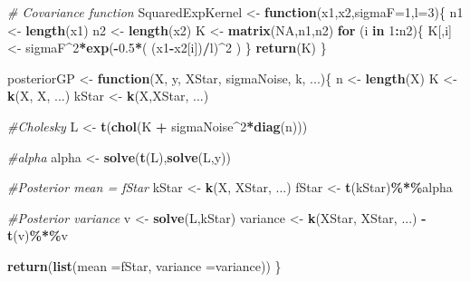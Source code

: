 \documentclass[
]{article}
\newenvironment{Shaded}{\begin{snugshade}}{\end{snugshade}}
\newcommand{\AttributeTok}[1]{\textcolor[rgb]{0.13,0.29,0.53}{#1}}
\newcommand{\CommentTok}[1]{\textcolor[rgb]{0.56,0.35,0.01}{\textit{#1}}}
\newcommand{\ConstantTok}[1]{\textcolor[rgb]{0.56,0.35,0.01}{#1}}
\newcommand{\ControlFlowTok}[1]{\textcolor[rgb]{0.13,0.29,0.53}{\textbf{#1}}}
\newcommand{\DecValTok}[1]{\textcolor[rgb]{0.00,0.00,0.81}{#1}}
\newcommand{\FloatTok}[1]{\textcolor[rgb]{0.00,0.00,0.81}{#1}}
\newcommand{\FunctionTok}[1]{\textcolor[rgb]{0.13,0.29,0.53}{\textbf{#1}}}
\newcommand{\NormalTok}[1]{#1}
\newcommand{\OtherTok}[1]{\textcolor[rgb]{0.56,0.35,0.01}{#1}}
\newcommand{\SpecialCharTok}[1]{\textcolor[rgb]{0.81,0.36,0.00}{\textbf{#1}}}
\begin{document}
\begin{Shaded}
\begin{Highlighting}[]
\CommentTok{\# Covariance function}
\NormalTok{SquaredExpKernel }\OtherTok{\textless{}{-}} \ControlFlowTok{function}\NormalTok{(x1,x2,}\AttributeTok{sigmaF=}\DecValTok{1}\NormalTok{,}\AttributeTok{l=}\DecValTok{3}\NormalTok{)\{}
\NormalTok{  n1 }\OtherTok{\textless{}{-}} \FunctionTok{length}\NormalTok{(x1)}
\NormalTok{  n2 }\OtherTok{\textless{}{-}} \FunctionTok{length}\NormalTok{(x2)}
\NormalTok{  K }\OtherTok{\textless{}{-}} \FunctionTok{matrix}\NormalTok{(}\ConstantTok{NA}\NormalTok{,n1,n2)}
  \ControlFlowTok{for}\NormalTok{ (i }\ControlFlowTok{in} \DecValTok{1}\SpecialCharTok{:}\NormalTok{n2)\{}
\NormalTok{    K[,i] }\OtherTok{\textless{}{-}}\NormalTok{ sigmaF}\SpecialCharTok{\^{}}\DecValTok{2}\SpecialCharTok{*}\FunctionTok{exp}\NormalTok{(}\SpecialCharTok{{-}}\FloatTok{0.5}\SpecialCharTok{*}\NormalTok{( (x1}\SpecialCharTok{{-}}\NormalTok{x2[i])}\SpecialCharTok{/}\NormalTok{l)}\SpecialCharTok{\^{}}\DecValTok{2}\NormalTok{ )}
\NormalTok{  \}}
  \FunctionTok{return}\NormalTok{(K)}
\NormalTok{\}}

\NormalTok{posteriorGP }\OtherTok{\textless{}{-}} \ControlFlowTok{function}\NormalTok{(X, y, XStar, sigmaNoise, k, ...)\{}
\NormalTok{  n }\OtherTok{\textless{}{-}} \FunctionTok{length}\NormalTok{(X)}
\NormalTok{  K }\OtherTok{\textless{}{-}} \FunctionTok{k}\NormalTok{(X, X, ...)}
\NormalTok{  kStar }\OtherTok{\textless{}{-}} \FunctionTok{k}\NormalTok{(X,XStar, ...)}
  
  \CommentTok{\#Cholesky }
\NormalTok{  L }\OtherTok{\textless{}{-}} \FunctionTok{t}\NormalTok{(}\FunctionTok{chol}\NormalTok{(K }\SpecialCharTok{+}\NormalTok{ sigmaNoise}\SpecialCharTok{\^{}}\DecValTok{2}\SpecialCharTok{*}\FunctionTok{diag}\NormalTok{(n)))}

  \CommentTok{\#alpha}
\NormalTok{  alpha }\OtherTok{\textless{}{-}} \FunctionTok{solve}\NormalTok{(}\FunctionTok{t}\NormalTok{(L),}\FunctionTok{solve}\NormalTok{(L,y))}
  
  \CommentTok{\#Posterior mean = fStar}
\NormalTok{  kStar }\OtherTok{\textless{}{-}} \FunctionTok{k}\NormalTok{(X, XStar, ...)}
\NormalTok{  fStar }\OtherTok{\textless{}{-}} \FunctionTok{t}\NormalTok{(kStar)}\SpecialCharTok{\%*\%}\NormalTok{alpha}

  \CommentTok{\#Posterior variance}
\NormalTok{  v }\OtherTok{\textless{}{-}} \FunctionTok{solve}\NormalTok{(L,kStar)}
\NormalTok{  variance }\OtherTok{\textless{}{-}} \FunctionTok{k}\NormalTok{(XStar, XStar, ...) }\SpecialCharTok{{-}} \FunctionTok{t}\NormalTok{(v)}\SpecialCharTok{\%*\%}\NormalTok{v}
  
  \FunctionTok{return}\NormalTok{(}\FunctionTok{list}\NormalTok{(}\AttributeTok{mean =}\NormalTok{fStar, }\AttributeTok{variance =}\NormalTok{variance))}
\NormalTok{\}}
\end{Highlighting}
\end{Shaded}
\end{document}
